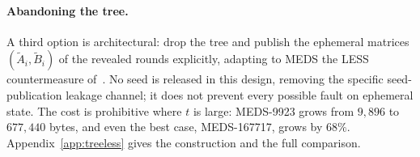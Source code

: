 \paragraph{Abandoning the tree.}

A third option is architectural: drop the tree and publish the ephemeral
matrices $(\tilde{A}_i,\tilde{B}_i)$ of the revealed rounds explicitly,
adapting to MEDS the LESS countermeasure of~\cite{ZKFault}. No seed is released in this design, removing the specific
seed-publication leakage channel; it does not prevent every possible fault
on ephemeral state. The cost is prohibitive where $t$ is large: MEDS-9923 grows from
$9{,}896$ to $677{,}440$ bytes, and even the best case, MEDS-167717, grows by
$68\%$. Appendix~\ref{app:treeless} gives the construction and the full
comparison.

